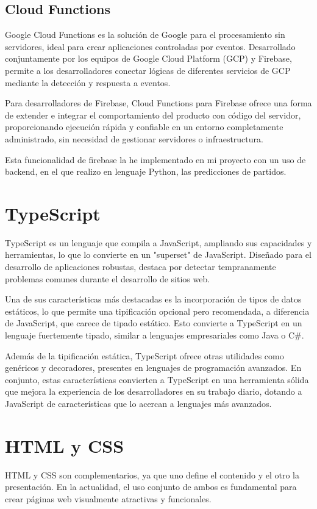 \subsection{Cloud Functions}
Google Cloud Functions \cite{cloud_functions} es la solución de Google para el procesamiento sin servidores, ideal para crear aplicaciones controladas por eventos. Desarrollado conjuntamente por los equipos de Google Cloud Platform (GCP) y Firebase, permite a los desarrolladores conectar lógicas de diferentes servicios de GCP mediante la detección y respuesta a eventos.

Para desarrolladores de Firebase, Cloud Functions para Firebase ofrece una forma de extender e integrar el comportamiento del producto con código del servidor, proporcionando ejecución rápida y confiable en un entorno completamente administrado, sin necesidad de gestionar servidores o infraestructura.

Esta funcionalidad de firebase la he implementado en mi proyecto con un uso de backend, en el que realizo en lenguaje Python, las predicciones de partidos.

\clearpage

\section{TypeScript}
TypeScript \cite{typescript} es un lenguaje que compila a JavaScript, ampliando sus capacidades y herramientas, lo que lo convierte en un "superset" de JavaScript. Diseñado para el desarrollo de aplicaciones robustas, destaca por detectar tempranamente problemas comunes durante el desarrollo de sitios web.

Una de sus características más destacadas es la incorporación de tipos de datos estáticos, lo que permite una tipificación opcional pero recomendada, a diferencia de JavaScript, que carece de tipado estático. Esto convierte a TypeScript en un lenguaje fuertemente tipado, similar a lenguajes empresariales como Java o C\#.

Además de la tipificación estática, TypeScript ofrece otras utilidades como genéricos y decoradores, presentes en lenguajes de programación avanzados. En conjunto, estas características convierten a TypeScript en una herramienta sólida que mejora la experiencia de los desarrolladores en su trabajo diario, dotando a JavaScript de características que lo acercan a lenguajes más avanzados.

\hfill

\section{HTML y CSS}
HTML y CSS son complementarios, ya que uno define el contenido y el otro la presentación. En la actualidad, el uso conjunto de ambos es fundamental para crear páginas web visualmente atractivas y funcionales.


